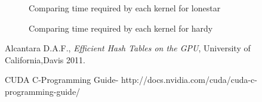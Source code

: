 \documentclass[a4paper,12pt]{report}
\begin{document}
\newpage
\begin{figure}
    \centering
    \caption{Comparing time required by each kernel for lonestar}
    \label{fig:allin1ls}
\end{figure}
\begin{figure}
    \centering
    \caption{Comparing time required by each kernel for hardy}
    \label{fig:allin1hd}
\end{figure}
\begin{thebibliography}{9}

  Alcantara D.A.F.,
  \emph{Efficient Hash Tables on the GPU},
  University of California,Davis
  2011.
  
 CUDA C-Programming Guide- http://docs.nvidia.com/cuda/cuda-c-programming-guide/
\end{thebibliography}
\end{document}
